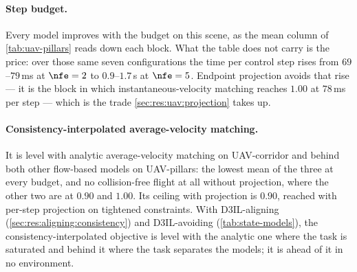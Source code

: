 \paragraph{Step budget.} Every model improves with the budget on this scene, as the mean column of
\autoref{tab:uav-pillars} reads down each block. What the table does not carry is the price: over those
same seven configurations the time per control step rises from $69$--$79$\,ms at $\nfe=2$ to
$0.9$--$1.7$\,s at $\nfe=5$. Endpoint projection avoids that rise --- it is the block in which
instantaneous-velocity matching reaches $1.00$ at $78$\,ms per step --- which is the trade
\autoref{sec:res:uav:projection} takes up.

\paragraph{Consistency-interpolated average-velocity matching.} It is level with analytic average-velocity
matching on UAV-corridor and behind both other flow-based models on UAV-pillars: the lowest mean of the
three at every budget, and no collision-free flight at all without projection, where the other two are at
$0.90$ and $1.00$. Its ceiling with projection is $0.90$, reached with per-step projection on tightened
constraints. With D3IL-aligning (\autoref{sec:res:aligning:consistency}) and D3IL-avoiding
(\autoref{tab:state-models}), the consistency-interpolated objective is level with the analytic one where
the task is saturated and behind it where the task separates the models; it is ahead of it in no
environment.


